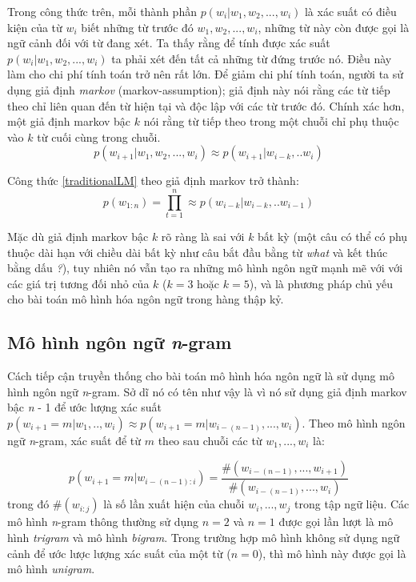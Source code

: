 Trong công thức trên, mỗi thành phần $p(w_i|w_1,w_2,...,w_{i})$ là xác suất có điều kiện của từ $w_i$ biết những từ trước đó $w_1,w_2,...,w_{i}$, những từ này còn được gọi là ngữ cảnh đối với từ đang xét. Ta thấy rằng để tính được xác suất $p(w_i|w_1,w_2,...,w_{i})$ ta phải xét đến tất cả những từ đứng trước nó. Điều này làm cho chi phí tính toán trở nên rất lớn. Để giảm chi phí tính toán, người ta sử dụng giả định \textit{markov} (markov-assumption); giả định này nói rằng các từ tiếp theo chỉ liên quan đến từ hiện tại và độc lập với các từ trước đó. Chính xác hơn, một giả định markov bậc $k$ nói rằng từ tiếp theo trong một chuỗi chỉ phụ thuộc vào $k$ từ cuối cùng trong chuỗi.
\begin{equation} \label{markovAssumption}
	p(w_{i+1}|w_1,w_2,...,w_{i}) \approx p(w_{i+1}|w_{i-k},..w_{i})
\end{equation}

Công thức \ref{traditionalLM} theo giả định markov trở thành:
\begin{equation} \label{traditionalLM}
	p(w_{1:n}) = \prod_{t=1}^{n} \approx p(w_{i-k}|w_{i-k},..w_{i-1})
\end{equation}

Mặc dù giả định markov bậc $k$ rõ ràng là sai với $k$ bất kỳ (một câu có thể có phụ thuộc dài hạn với chiều dài bất kỳ như câu bắt đầu bằng từ \textit{what} và kết thúc bằng dấu \textit{?}), tuy nhiên nó vẫn tạo ra những mô hình ngôn ngữ mạnh mẽ với với các giá trị tương đối nhỏ của $k$ ($k=3$ hoặc $k=5$), và là phương pháp chủ yếu cho bài toán mô hình hóa ngôn ngữ trong hàng thập kỷ.

\subsection{Mô hình ngôn ngữ \textit{n}-gram}

Cách tiếp cận truyền thống cho bài toán mô hình hóa ngôn ngữ là sử dụng mô hình ngôn ngữ \textit{n}-gram. Sở dĩ nó có tên như vậy là vì nó sử dụng giả định markov bậc \textit{n} - 1 để ước lượng xác suất $p \left(w_{i+1}=m|w_1,..,w_i \right) \approx p \left(w_{i+1}=m|w_{i-(n-1)},...,w_i \right)$. Theo mô hình ngôn ngữ \textit{n}-gram, xác suất để từ $m$ theo sau chuỗi các từ $w_1,...,w_{i}$ là:

\begin{equation} \label{ngramLM}
	p \left(w_{i+1}=m|w_{i-(n-1):i} \right) = \frac{\# \left(w_{i-(n-1)},...,w_{i+1} \right)}{\# \left(w_{i-(n-1)},...,w_i \right)}
\end{equation}
trong đó $\#(w_{i:j})$ là số lần xuất hiện của chuỗi $w_i,...,w_j$ trong tập ngữ liệu. Các mô hình \textit{n}-gram thông thường sử dụng $n = 2$ và $n = 1$ được gọi lần lượt là mô hình \textit{trigram} và mô hình \textit{bigram}. Trong trường hợp mô hình không sử dụng ngữ cảnh để ước lược lượng xác
suất của một từ ($n = 0$), thì mô hình này được gọi là mô hình \textit{unigram}.

